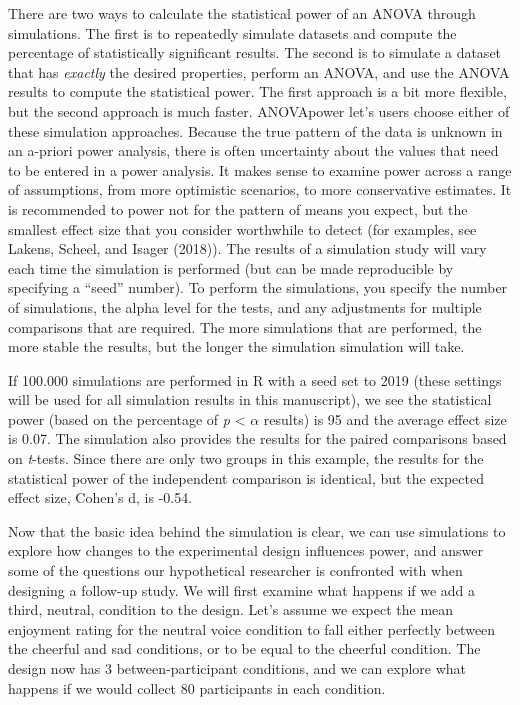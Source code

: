 \documentclass[,jou,floatsintext]{apa6}
\begin{document}
There are two ways to calculate the statistical power of an ANOVA through simulations.
The first is to repeatedly simulate datasets and compute the percentage of statistically significant results.
The second is to simulate a dataset that has \emph{exactly} the desired properties, perform an ANOVA, and use the ANOVA results to compute the statistical power.
The first approach is a bit more flexible, but the second approach is much faster.
ANOVApower let's users choose either of these simulation approaches.
Because the true pattern of the data is unknown in an a-priori power analysis, there is often uncertainty about the values that need to be entered in a power analysis.
It makes sense to examine power across a range of assumptions, from more optimistic scenarios, to more conservative estimates.
It is recommended to power not for the pattern of means you expect, but the smallest effect size that you consider worthwhile to detect (for examples, see Lakens, Scheel, and Isager (2018)).
The results of a simulation study will vary each time the simulation is performed (but can be made reproducible by specifying a \enquote{seed} number).
To perform the simulations, you specify the number of simulations, the alpha level for the tests, and any adjustments for multiple comparisons that are required.
The more simulations that are performed, the more stable the results, but the longer the simulation simulation will take.

If 100.000 simulations are performed in R with a seed set to 2019 (these settings will be used for all simulation results in this manuscript), we see the statistical power (based on the percentage of \emph{p} \textless{} \(\alpha\) results) is 95 and the average effect size is 0.07.
The simulation also provides the results for the paired comparisons based on \emph{t}-tests.
Since there are only two groups in this example, the results for the statistical power of the independent comparison is identical, but the expected effect size, Cohen's d, is -0.54.

Now that the basic idea behind the simulation is clear, we can use simulations to explore how changes to the experimental design influences power, and answer some of the questions our hypothetical researcher is confronted with when designing a follow-up study.
We will first examine what happens if we add a third, neutral, condition to the design.
Let's assume we expect the mean enjoyment rating for the neutral voice condition to fall either perfectly between the cheerful and sad conditions, or to be equal to the cheerful condition.
The design now has 3 between-participant conditions, and we can explore what happens if we would collect 80 participants in each condition.
\end{document}
